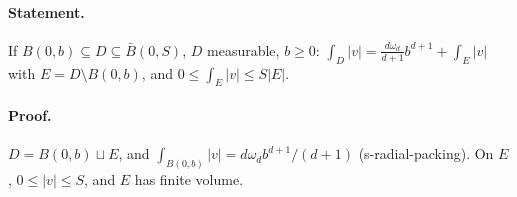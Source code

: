 \paragraph{Statement.} If $B(0,b)\subseteq D\subseteq\bar B(0,S)$, $D$ measurable, $b\geq0$: $\int_D|v|=\frac{d\omega_d}{d+1}b^{d+1}+\int_E|v|$ with $E=D\setminus B(0,b)$,
and $0\leq\int_E|v|\leq S|E|$.
\paragraph{Proof.} $D=B(0,b)\sqcup E$, and $\int_{B(0,b)}|v|=d\omega_db^{d+1}/(d+1)$ (s-radial-packing). On $E$, $0\leq|v|\leq S$, and $E$ has finite volume.
